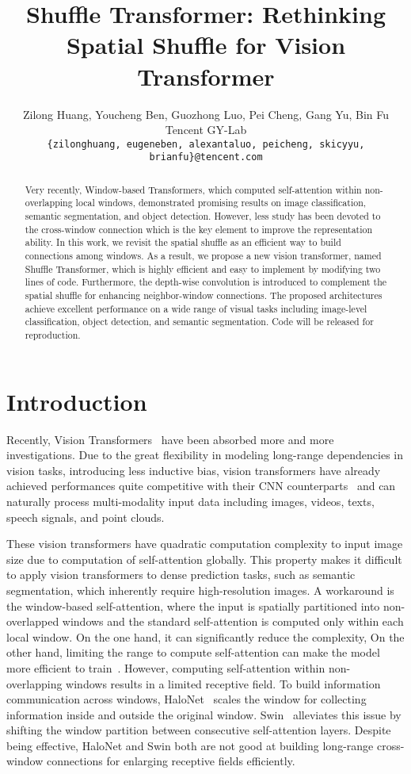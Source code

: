 \documentclass{article}
\title{Shuffle Transformer: Rethinking Spatial Shuffle for Vision Transformer}
\author{Zilong Huang,  Youcheng Ben,  Guozhong Luo, Pei Cheng, Gang Yu, Bin Fu \\
Tencent GY-Lab \\
    \tt\small\{zilonghuang, eugeneben, alexantaluo, peicheng, skicyyu, brianfu\}@tencent.com \\
}
\begin{document}
\maketitle

\begin{abstract}
  Very recently, Window-based Transformers, which computed self-attention within non-overlapping local windows, demonstrated promising results on image classification, semantic segmentation, and object detection. However, less study has been devoted to the cross-window connection which is the key element to improve the representation ability. In this work, we revisit the spatial shuffle as an efficient way to build connections among windows. As a result, we propose a new vision transformer, named Shuffle Transformer, which is highly efficient and easy to implement by modifying two lines of code. Furthermore, the depth-wise convolution is introduced to complement the spatial shuffle for enhancing neighbor-window connections. The proposed architectures achieve excellent performance on a wide range of visual tasks including image-level classification, object detection, and semantic segmentation. Code will be released for reproduction.
\end{abstract}


\section{Introduction}
Recently, Vision Transformers~\cite{dosovitskiy2020image,touvron2020deit,carion2020end,zheng2020rethinking} have been absorbed more and more investigations. Due to the great flexibility in modeling long-range dependencies in vision tasks, introducing less inductive bias, vision transformers have already achieved performances quite competitive with their CNN counterparts~\cite{he2016deep,tan2019efficientnet}
and can naturally process multi-modality input data including images, videos, texts, speech signals,
and point clouds. 


These vision transformers have quadratic computation complexity to input image size due to computation of self-attention globally. This property makes it difficult to apply vision transformers to dense prediction tasks, such as semantic segmentation, which inherently require high-resolution images. A workaround is the window-based self-attention, where the input is spatially partitioned into non-overlapped windows and the standard self-attention is computed only within each local window. On the one hand, it can significantly reduce the complexity, On the other hand, limiting the range to compute self-attention can make
the model more efficient to train~\cite{beltagy2020longformer,zhu2020deformable}. However, computing self-attention within non-overlapping windows results in a limited receptive field. To build information communication across windows, HaloNet~\cite{vaswani2021scaling} scales the window for collecting information inside and outside the original window. Swin~\cite{liu2021Swin} alleviates this issue by shifting the window partition between consecutive self-attention layers. Despite being effective, HaloNet and Swin both are not good at building long-range cross-window connections for enlarging receptive fields efficiently. 
\end{document}
